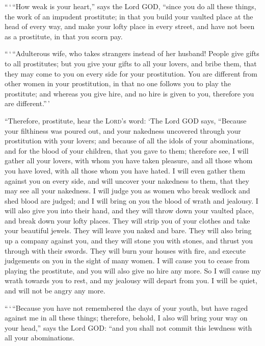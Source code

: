 ``\,`\,``How weak is your heart,'' says the Lord GOD,
``since you do all these things, the work of an impudent prostitute;
 in that you build your vaulted place at the head of
every way, and make your lofty place in every street, and have not been
as a prostitute, in that you scorn pay.

 ``\,`\,``Adulterous wife, who takes strangers instead of
her husband!  People give gifts to all prostitutes; but
you give your gifts to all your lovers, and bribe them, that they may
come to you on every side for your prostitution.  You are
different from other women in your prostitution, in that no one follows
you to play the prostitute; and whereas you give hire, and no hire is
given to you, therefore you are different.''\,'

 ``Therefore, prostitute, hear the \textsc{Lord}'s word:
 `The Lord GOD says, ``Because your filthiness was poured
out, and your nakedness uncovered through your prostitution with your
lovers; and because of all the idols of your abominations, and for the
blood of your children, that you gave to them;  therefore
see, I will gather all your lovers, with whom you have taken pleasure,
and all those whom you have loved, with all those whom you have hated. I
will even gather them against you on every side, and will uncover your
nakedness to them, that they may see all your nakedness. 
I will judge you as women who break wedlock and shed blood are judged;
and I will bring on you the blood of wrath and jealousy. 
I will also give you into their hand, and they will throw down your
vaulted place, and break down your lofty places. They will strip you of
your clothes and take your beautiful jewels. They will leave you naked
and bare.  They will also bring up a company against you,
and they will stone you with stones, and thrust you through with their
swords.  They will burn your houses with fire, and
execute judgements on you in the sight of many women. I will cause you
to cease from playing the prostitute, and you will also give no hire any
more.  So I will cause my wrath towards you to rest, and
my jealousy will depart from you. I will be quiet, and will not be angry
any more.

 ``\,`\,``Because you have not remembered the days of
your youth, but have raged against me in all these things; therefore,
behold, I also will bring your way on your head,'' says the Lord GOD:
``and you shall not commit this lewdness with all your abominations.

